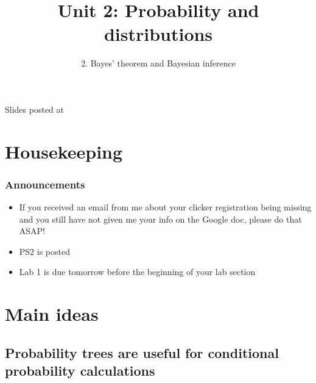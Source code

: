 \documentclass[slidestop,compress,mathserif,12pt,t,professionalfonts,xcolor=table]{beamer}
\title{Unit 2: Probability and distributions}
\subtitle{2. Bayes' theorem and Bayesian inference}
\author{\CourseName}
\date{}
\institute{\InstituteName}
\begin{document}



\begin{frame}[plain]

\titlepage

\vfill

{\scriptsize {} \hfill Slides posted at  \webURL{\CourseSite}}

\addtocounter{framenumber}{-1} 

\end{frame}


\section{Housekeeping}


\begin{frame}
\frametitle{Announcements}

\begin{itemize}

\item If you received an email from me about your clicker registration being
missing and you still have not given me your info on the Google doc, please do that ASAP!

\item PS2 is posted

\item Lab 1 is due tomorrow before the beginning of your lab section

\end{itemize}

\end{frame}


\section{Main ideas}


\subsection{Probability trees are useful for conditional probability calculations}
\label{mi1}
\end{document}
